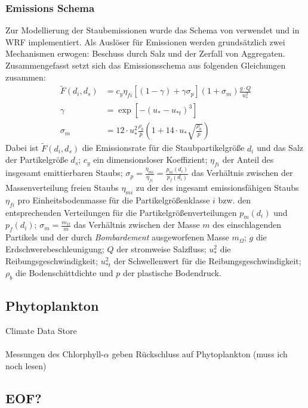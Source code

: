 \documentclass[12pt,a4paper,onecolumn]{scrartcl}
\begin{document}
\subsubsection{Emissions Schema}
Zur Modellierung der Staubemissionen wurde das Schema von \citet{Shao.2004} verwendet und in WRF implementiert. Als Auslöser für Emissionen werden grundsätzlich zwei Mechanismen erwogen: Beschuss durch Salz und der Zerfall von Aggregaten. Zusammengefasst setzt sich das Emissionsschema \citep{Shao.2004} aus folgenden Gleichungen zusammen:
\begin{align}
\tilde{F} (d_i,d_s) &= c_y \eta_{fi} \left[\left(1-\gamma\right) + \gamma
\sigma_p \right] \left(1+\sigma_m \right) \frac{g \cdot Q}{u^2_*} \\
\gamma &= \exp \left[-\left(u_* - u_{*t} \right)^3\right] \\ 
\sigma_m &= 12 \cdot u_*^2 \frac{\rho_b}{p} \left(1 +14 \cdot u_* \sqrt{\frac{\rho_b}{p}} \right)
\end{align}
Dabei ist $\tilde{F}(d_i,d_s)$ die Emissionsrate für die Staubpartikelgröße $d_i$ und das Salz der Partikelgröße $d_s$; $c_y$ ein dimensionsloser Koeffizient; $\eta_{fi}$ der Anteil des insgesamt emittierbaren Staubs; $\sigma_p = \frac{\eta_{mi}}{\eta_{fi}} = \frac{p_{m}(d_i)}{p_{f}(d_i)}$ das Verhältnis zwischen der Massenverteilung freien Staubs $\eta_{mi}$ zu der des ingesamt emissionsfähigen Staubs $\eta_{fi}$ pro Einheitsbodenmasse für die Partikelgrößenklasse $i$ bzw. den entsprechenden Verteilungen für die Partikelgrößenverteilungen $p_{m}(d_i)$ und $p_{f}(d_i)$;  $\sigma_m= \frac{m_\Omega}{m}$ das Verhältnis zwischen der Masse  $m$ des einschlagenden Partikels und der durch \textit{Bombardement} ausgeworfenen Masse $m_\Omega$; $g$ die Erdschwerebeschleunigung; $Q$ der stromweise Salzfluss; $u_*^2$ die Reibungsgeschwindigkeit; $u_{*t}^2$ der Schwellenwert für die Reibungsgeschwindigkeit; $\rho_b$ die Bodenschüttdichte und $p$ der plastische Bodendruck.
\subsection{Phytoplankton}
Climate Data Store \nocite{*}
\\\\
Messungen des Chlorphyll-$\alpha$ geben Rückschluss auf Phytoplankton \citep{RYTHER.1957}(muss ich noch lesen)

\subsection{EOF?}
\end{document}
